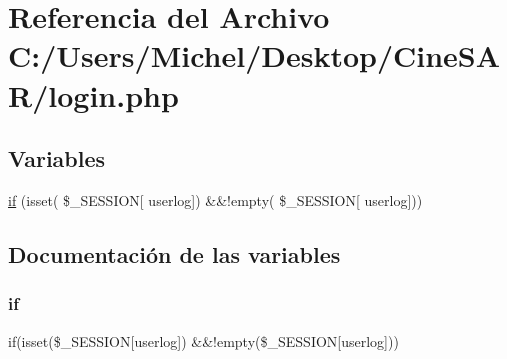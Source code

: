 \hypertarget{login_8php}{}\section{Referencia del Archivo C\+:/\+Users/\+Michel/\+Desktop/\+Cine\+S\+A\+R/login.php}
\label{login_8php}
\subsection*{Variables}
\begin{DoxyCompactItemize}
\item 
\mbox{\hyperlink{login_8php_aefb5893336d7ead40ae915367f4b82cc}{if}} (isset( \$\+\_\+\+S\+E\+S\+S\+I\+ON\mbox{[} \textquotesingle{}userlog\textquotesingle{}\mbox{]}) \&\&!empty( \$\+\_\+\+S\+E\+S\+S\+I\+ON\mbox{[} \textquotesingle{}userlog\textquotesingle{}\mbox{]}))
\end{DoxyCompactItemize}


\subsection{Documentación de las variables}
\mbox{\label{login_8php_aefb5893336d7ead40ae915367f4b82cc}} 
\subsubsection{\texorpdfstring{if}{if}}
{\footnotesize\ttfamily if(isset(\$\+\_\+\+S\+E\+S\+S\+I\+ON\mbox{[}\textquotesingle{}userlog\textquotesingle{}\mbox{]}) \&\&!empty(\$\+\_\+\+S\+E\+S\+S\+I\+ON\mbox{[}\textquotesingle{}userlog\textquotesingle{}\mbox{]}))}

